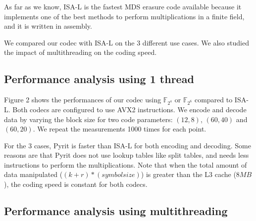\documentclass[conference]{IEEEtran}
\begin{document}
As far as we know, ISA-L is the fastest MDS erasure code available because it implements one of the best methods to perform multiplications in a finite field, and it is written in assembly. 

We compared our codec with ISA-L on the 3 different use cases. We also studied the impact of multithreading on the coding speed.


\subsection{Performance analysis using 1 thread}

Figure 2 shows the performances of our codec using  $\mathbb{F}_{2^4}$ or  $\mathbb{F}_{2^6}$ compared to ISA-L. Both codecs are configured to use AVX2 instructions. We encode and decode data by varying the block size for two code parameters: $(12,8)$, $(60,40)$ and $(60,20)$. We repeat the measurements 1000 times for each point.

For the 3 cases, Pyrit is faster than ISA-L for both encoding and decoding. Some reasons are that Pyrit does not use lookup tables like split tables, and needs less instructions to perform the multiplications.
Note that when the total amount of data manipulated ($(k+r)*(symbol size)$) is greater than the L3 cache ($8MB$), the coding speed is constant for both codecs.

\subsection{Performance analysis using multithreading}
\end{document}
